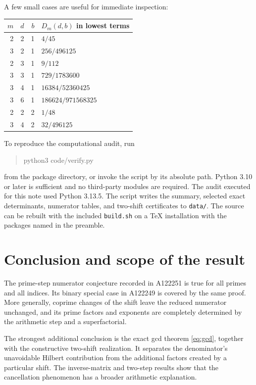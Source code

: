 \documentclass[11pt,a4paper]{article}
\theoremstyle{definition}
\theoremstyle{remark}
\begin{document}
A few small cases are useful for immediate inspection:
\begin{center}
\begin{tabular}{@{}rrr@{\qquad}l@{}}
\toprule
$m$ & $d$ & $b$ & $D_m(d,b)$ in lowest terms\\
\midrule
2&2&1&$4/45$\\
3&2&1&$256/496125$\\
2&3&1&$9/112$\\
3&3&1&$729/1783600$\\
3&4&1&$16384/52360425$\\
3&6&1&$186624/971568325$\\
2&2&2&$1/48$\\
3&4&2&$32/496125$\\
\bottomrule
\end{tabular}
\end{center}

To reproduce the computational audit, run
\begin{quote}\ttfamily
python3 code/verify.py
\end{quote}
from the package directory, or invoke the script by its absolute path.
Python 3.10 or later is sufficient and no third-party modules are required.
The audit executed for this note used Python 3.13.5. The script writes the
summary, selected exact determinants, numerator tables, and two-shift
certificates to \texttt{data/}. The source can be rebuilt with the included
\texttt{build.sh} on a TeX installation with the packages named in the
preamble.

\section{Conclusion and scope of the result}

The prime-step numerator conjecture recorded in A122251 is true for all
primes and all indices. Its binary special case in A122249 is covered by
the same proof. More generally, coprime changes of the shift leave the
reduced numerator unchanged, and its prime factors and exponents are
completely determined by the arithmetic step and a superfactorial.

The strongest additional conclusion is the exact gcd theorem
\eqref{eq:gcd}, together with the constructive two-shift realization.
It separates the denominator's unavoidable Hilbert contribution from the
additional factors created by a particular shift. The inverse-matrix and
two-step results show that the cancellation phenomenon has a broader
arithmetic explanation.
\end{document}
